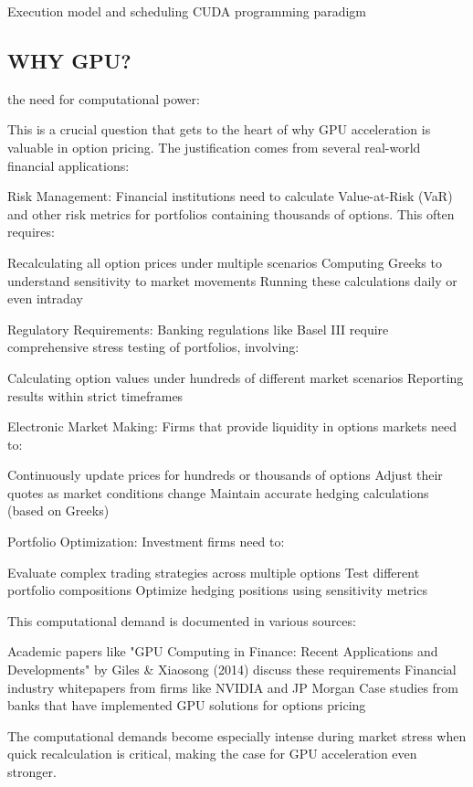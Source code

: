 \documentclass[english,12pt,a4paper,pdftex,sci,utf8]{aaltothesis}
\begin{document}
Execution model and scheduling
CUDA programming paradigm

\subsection{WHY GPU?} the need for computational power:

This is a crucial question that gets to the heart of why GPU acceleration is valuable in option pricing. The justification comes from several real-world financial applications:

Risk Management: Financial institutions need to calculate Value-at-Risk (VaR) and other risk metrics for portfolios containing thousands of options. This often requires:

Recalculating all option prices under multiple scenarios
Computing Greeks to understand sensitivity to market movements
Running these calculations daily or even intraday


Regulatory Requirements: Banking regulations like Basel III require comprehensive stress testing of portfolios, involving:

Calculating option values under hundreds of different market scenarios
Reporting results within strict timeframes


Electronic Market Making: Firms that provide liquidity in options markets need to:

Continuously update prices for hundreds or thousands of options
Adjust their quotes as market conditions change
Maintain accurate hedging calculations (based on Greeks)


Portfolio Optimization: Investment firms need to:

Evaluate complex trading strategies across multiple options
Test different portfolio compositions
Optimize hedging positions using sensitivity metrics



This computational demand is documented in various sources:

Academic papers like "GPU Computing in Finance: Recent Applications and Developments" by Giles \& Xiaosong (2014) discuss these requirements
Financial industry whitepapers from firms like NVIDIA and JP Morgan
Case studies from banks that have implemented GPU solutions for options pricing

The computational demands become especially intense during market stress when quick recalculation is critical, making the case for GPU acceleration even stronger.
\end{document}
